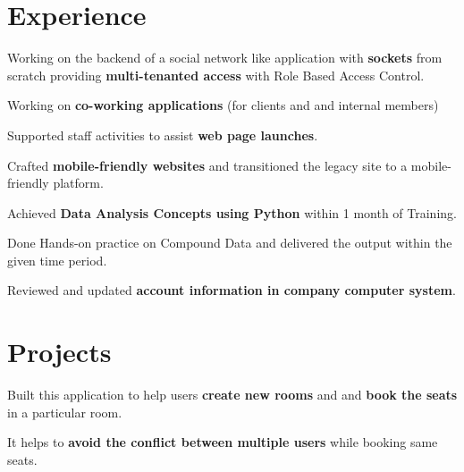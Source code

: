 \documentclass[]{deedy-resume-openfont}
\begin{document}
\hfill
\begin{minipage}[t]{0.66\textwidth} 


\section{Experience}

\vspace{\topsep} %
\begin{tightemize}
\item Working on the backend of a social network like application with \textbf{sockets} from scratch providing \textbf{multi-tenanted access} with Role Based Access Control.
\item Working on \textbf{co-working applications} (for clients and and internal members)
\end{tightemize}

\sectionsep

\begin{tightemize}
\item Supported staff activities to assist \textbf{web page launches}.
\item Crafted \textbf{mobile-friendly websites} and transitioned the legacy site to a mobile-friendly platform.
\end{tightemize}

\begin{tightemize}
\item Achieved \textbf{Data Analysis Concepts using Python} within 1 month of Training.
\item Done Hands-on practice on Compound Data and delivered the output within the given time period.
\item Reviewed and updated \textbf{account information in company computer system}.
\end{tightemize}
\sectionsep



\section{Projects}
{\href{https://github.com/Niharika100/Niharika100-bookRoom_backend}{\bf{}}}
\begin{tightemize}
\item Built this application to help users \textbf{create new rooms} and and \textbf{book the seats} in a particular room.
\item It helps to \textbf{avoid the conflict between multiple users} while booking same seats.
\end{tightemize}


\end{minipage}
\end{document}
